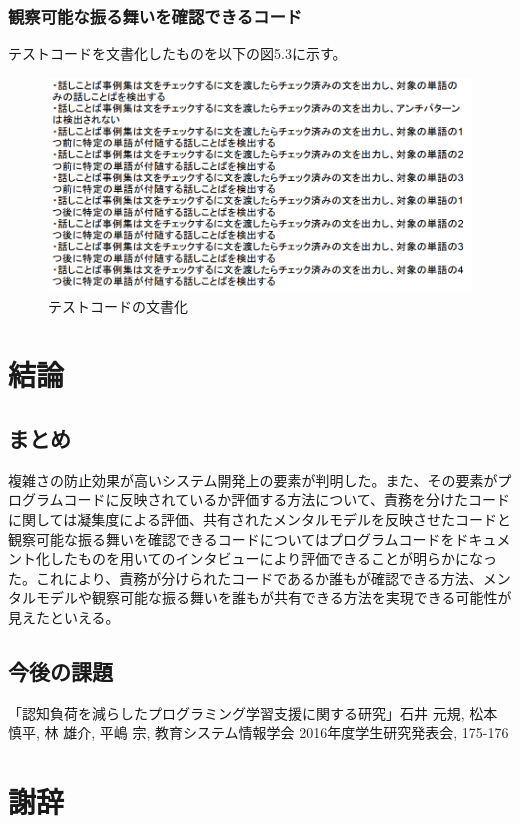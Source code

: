 \documentclass[11pt, a4paper]{jreport}
\begin{document}
\subsection{観察可能な振る舞いを確認できるコード}
テストコードを文書化したものを以下の図5.3に示す。
\begin{figure}[H]
\centering
\includegraphics[width=1\linewidth]{image/hurumai.png}
\caption{テストコードの文書化}
\label{fig:enter-label}
\end{figure}
\chapter{結論}
\section{まとめ}
複雑さの防止効果が高いシステム開発上の要素が判明した。また、その要素がプログラムコードに反映されているか評価する方法について、責務を分けたコードに関しては凝集度による評価、共有されたメンタルモデルを反映させたコードと観察可能な振る舞いを確認できるコードについてはプログラムコードをドキュメント化したものを用いてのインタビューにより評価できることが明らかになった。これにより、責務が分けられたコードであるか誰もが確認できる方法、メンタルモデルや観察可能な振る舞いを誰もが共有できる方法を実現できる可能性が見えたといえる。
\section{今後の課題}
\renewcommand{\bibname}{参考文献}
\begin{thebibliography}{10}
「認知負荷を減らしたプログラミング学習支援に関する研究」石井 元規, 松本 慎平, 林 雄介, 平嶋 宗, 教育システム情報学会 2016年度学生研究発表会, 175-176
\end{thebibliography}

\chapter*{謝辞}
\end{document}

